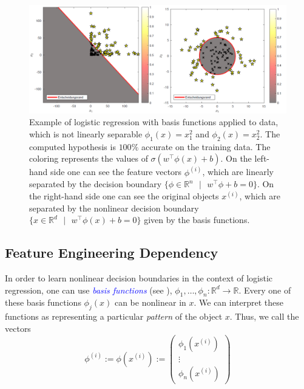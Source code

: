 \begin{figure}[h!]
    \centering
    \includegraphics[width=\textwidth]{images/figure5.png}
    \caption{
        Example of logistic regression with basis functions applied to data, which is not linearly separable $\phi_1(x) = x_1^2$ and $\phi_2(x) = x_2^2$. The computed hypothesis is $100\%$ accurate on the training data. The coloring represents the values of $\sigma(w^\top \phi(x)+b)$. On the left-hand side one can see the feature vectors $\phi^{(i)}$, which are linearly separated by the decision boundary $\{\phi \in \mathbb{R}^n\text{ }|\text{ }w^ \top\phi+b =0\}$. On the right-hand side one can see the original objects $x^{(i)}$, which are separated by the nonlinear decision boundary $\{x \in \mathbb{R}^d\text{ }|\text{ }w^ \top\phi(x)+b =0\}$ given by the basis functions.
    }
    \label{fig:5}
\end{figure}

\subsection{Feature Engineering Dependency}
In order to learn nonlinear decision boundaries in the context of logistic regression, one can use \textcolor{blue}{\emph{basis functions}} (see \cite[chapter 4.3.2]{bishop2006pattern}), $\phi_1, \dots, \phi_n : \mathbb{R}^d \rightarrow \mathbb{R}$. Every one of these basis functions $\phi_j(x)$ can be nonlinear in $x$. We can interpret these functions as representing a particular \emph{pattern} of the object $x$. Thus, we call the vectors
\begin{equation}
    \phi^{(i)} := \phi(x^{(i)}) := 
    \begin{pmatrix}
        \phi_1(x^{(i)}) \\
        \vdots \\
        \phi_n(x^{(i)})
    \end{pmatrix}
    \label{eq:18}
\end{equation}

